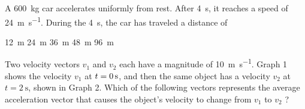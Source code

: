 \documentclass{../../../oss-ap12ibhl-print}
\begin{document}
\begin{questions}
  \uplevel{\rule{\linewidth}{.6pt}}
  
  \question A \SI{600}{\kilo\gram} car accelerates uniformly from rest. After
  \SI{4}{\second}, it reaches a speed of \SI{24}{\metre\per\second}. During
  the \SI{4}{\second}, the car has traveled a distance of

  \begin{oneparchoices}
    \choice\SI{12}{\metre}\hspace{.28in}
    \choice\SI{24}{\metre}\hspace{.28in}
    \choice\SI{36}{\metre}\hspace{.28in}
    \choice\SI{48}{\metre}\hspace{.28in}
    \choice\SI{96}{\metre}
  \end{oneparchoices}
  \newpage
  
  \question Two velocity vectors $v_1$ and $v_2$ each have a magnitude of
  \SI{10}{\metre\per\second}. Graph 1 shows the velocity $v_1$ at
  $t=\SI0{\second}$, and then the same object has a velocity $v_2$ at
  $t=\SI{2}{\second}$, shown in Graph 2. Which of the following vectors
  represents the average acceleration vector that causes the object's velocity
  to change from $v_1$ to $v_2$ ?
  \begin{center}
    \hspace{.2in}
  \end{center}
  \begin{oneparchoices}
    \choice
    \choice
    \choice

\end{oneparchoices}
\end{questions}
\end{document}
